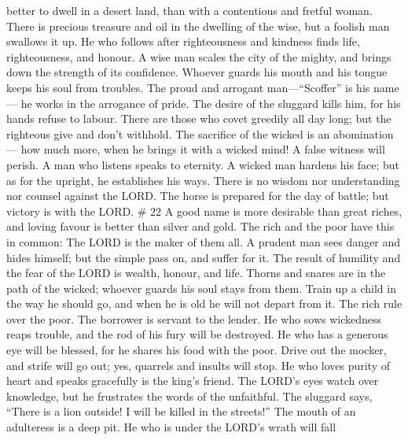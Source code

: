 better to dwell in a desert land, than with a contentious and fretful
woman.  There is precious treasure and oil in the
dwelling of the wise, but a foolish man swallows it up. 
He who follows after righteousness and kindness finds life,
righteousness, and honour.  A wise man scales the city of
the mighty, and brings down the strength of its confidence.
 Whoever guards his mouth and his tongue keeps his soul
from troubles.  The proud and arrogant man---``Scoffer''
is his name--- he works in the arrogance of pride.  The
desire of the sluggard kills him, for his hands refuse to labour.
 There are those who covet greedily all day long; but the
righteous give and don't withhold.  The sacrifice of the
wicked is an abomination--- how much more, when he brings it with a
wicked mind!  A false witness will perish. A man who
listens speaks to eternity.  A wicked man hardens his
face; but as for the upright, he establishes his ways. 
There is no wisdom nor understanding nor counsel against the LORD.
 The horse is prepared for the day of battle; but victory
is with the LORD. \# 22  A good name is more desirable
than great riches, and loving favour is better than silver and gold.
 The rich and the poor have this in common: The LORD is
the maker of them all.  A prudent man sees danger and
hides himself; but the simple pass on, and suffer for it. 
The result of humility and the fear of the LORD is wealth, honour, and
life.  Thorns and snares are in the path of the wicked;
whoever guards his soul stays from them.  Train up a child
in the way he should go, and when he is old he will not depart from it.
 The rich rule over the poor. The borrower is servant to
the lender.  He who sows wickedness reaps trouble, and the
rod of his fury will be destroyed.  He who has a generous
eye will be blessed, for he shares his food with the poor.
 Drive out the mocker, and strife will go out; yes,
quarrels and insults will stop.  He who loves purity of
heart and speaks gracefully is the king's friend.  The
LORD's eyes watch over knowledge, but he frustrates the words of the
unfaithful.  The sluggard says, ``There is a lion
outside! I will be killed in the streets!''  The mouth of
an adulteress is a deep pit. He who is under the LORD's wrath will fall
